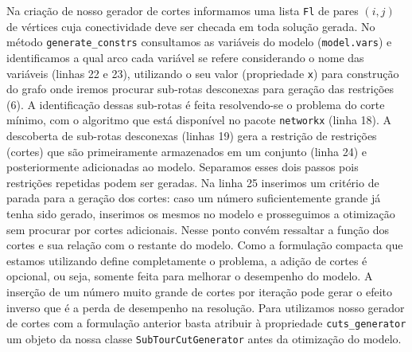 \documentclass[a4paper,11pt,fleqn]{article}
\begin{document}
Na criação de nosso gerador de cortes informamos uma lista \texttt{Fl} de pares $(i,j)$ de vértices cuja conectividade deve ser checada em toda solução gerada. No método \texttt{generate\_constrs} consultamos as variáveis do modelo (\texttt{model.vars}) e identificamos a qual arco cada variável se refere considerando o nome das variáveis (linhas 22 e  23), utilizando o seu valor (propriedade \texttt{x}) para construção do grafo onde iremos procurar sub-rotas desconexas para geração das restrições (6). A identificação dessas sub-rotas é feita resolvendo-se o problema do corte mínimo, com o algoritmo que está disponível no pacote \texttt{networkx} (linha 18). A descoberta de sub-rotas desconexas (linhas 19) gera a restrição de restrições (cortes) que são primeiramente armazenados em um conjunto (linha 24) e posteriormente adicionadas ao modelo. Separamos esses dois passos pois restrições repetidas podem ser geradas. Na linha 25 inserimos um critério de parada para a geração dos cortes: caso um número suficientemente grande já tenha sido gerado, inserimos os mesmos no modelo e prosseguimos a otimização sem procurar por cortes adicionais. Nesse ponto convém ressaltar a função dos cortes e sua relação com o restante do modelo. Como a formulação compacta que estamos utilizando define completamente o problema, a adição de cortes é opcional, ou seja, somente feita para melhorar o desempenho do modelo. A inserção de um número muito grande de cortes por iteração pode gerar o efeito inverso que é a perda de desempenho na resolução. Para utilizamos nosso gerador de cortes com a formulação anterior basta atribuir à propriedade \texttt{cuts\_generator} um objeto da nossa classe \texttt{SubTourCutGenerator} antes da otimização do modelo.
		


\end{document}
